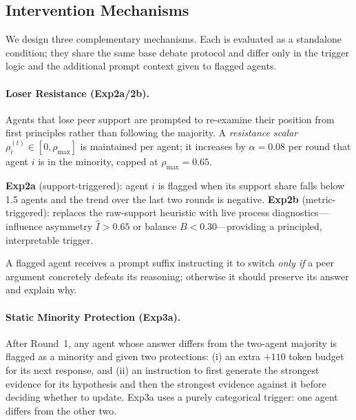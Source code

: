 \subsection{Intervention Mechanisms}
\label{sec:mechanisms}

We design three complementary mechanisms.
Each is evaluated as a standalone condition; they share the same base
debate protocol and differ only in the trigger logic and the additional
prompt context given to flagged agents.

\paragraph{Loser Resistance (Exp2a/2b).}
Agents that lose peer support are prompted to re-examine their position
from first principles rather than following the majority.
A \emph{resistance scalar} $\rho_i^{(t)}\!\in\![0,\rho_{\max}]$ is
maintained per agent; it increases by $\alpha\!=\!0.08$ per round that
agent $i$ is in the minority, capped at $\rho_{\max}\!=\!0.65$.

\textbf{Exp2a} (support-triggered): agent $i$ is flagged when its support
share falls below 1.5 agents and the trend over the last two rounds is
negative.
\textbf{Exp2b} (metric-triggered): replaces the raw-support heuristic with
live process diagnostics—influence asymmetry $\hat{I}>0.65$ or balance
$B<0.30$—providing a principled, interpretable trigger.

A flagged agent receives a prompt suffix instructing it to switch
\emph{only if} a peer argument concretely defeats its reasoning; otherwise
it should preserve its answer and explain why.

\paragraph{Static Minority Protection (Exp3a).}
After Round~1, any agent whose answer differs from the two-agent majority is
flagged as a minority and given two protections: (i) an extra $+110$ token
budget for its next response, and (ii) an instruction to first generate the
strongest evidence for its hypothesis and then the strongest evidence against
it before deciding whether to update.
Exp3a uses a purely categorical trigger: one agent differs from the other two.

